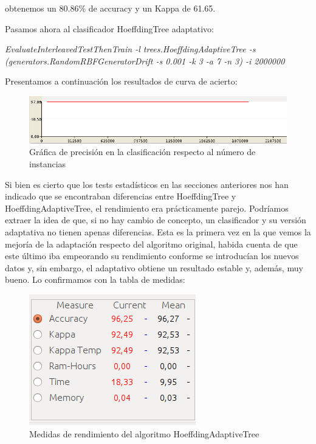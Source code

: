 obtenemos un 80.86\% de accuracy y un Kappa de 61.65.

Pasamos ahora al clasificador HoeffdingTree adaptativo:

\textit{EvaluateInterleavedTestThenTrain -l trees.HoeffdingAdaptiveTree -s \\ (generators.RandomRBFGeneratorDrift -s 0.001 -k 3 -a 7 -n 3) -i 2000000}

Presentamos a continuación los resultados de curva de acierto:

\begin{figure}[H] %
	\centering
	\includegraphics[scale=0.4]{cd3.png}  %
	\caption{Gráfica de precisión en la clasificación respecto al número de instancias} 
	\label{fig:cd3}
\end{figure}

Si bien es cierto que los tests estadísticos en las secciones anteriores nos han indicado que se encontraban diferencias entre HoeffdingTree y HoeffdingAdaptiveTree, el rendimiento era prácticamente parejo. Podríamos extraer la idea de que, si no hay cambio de concepto, un clasificador y su versión adaptativa no tienen apenas diferencias. Esta es la primera vez en la que vemos la mejoría de la adaptación respecto del algoritmo original, habida cuenta de que este último iba empeorando su rendimiento conforme se introducían los nuevos datos y, sin embargo, el adaptativo obtiene un resultado estable y, además, muy bueno. Lo confirmamos con la tabla de medidas:

\begin{figure}[H] %
	\centering
	\includegraphics[scale=0.4]{cd4.png}  %
	\caption{Medidas de rendimiento del algoritmo HoeffdingAdaptiveTree} 
	\label{fig:cd4}
\end{figure}

